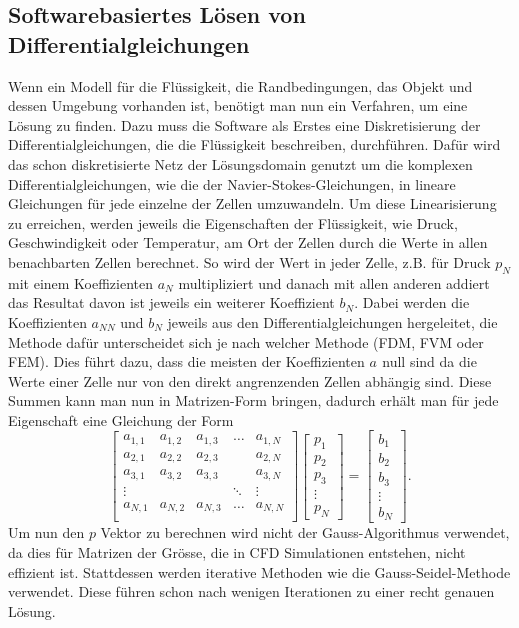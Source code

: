 \subsection{Softwarebasiertes Lösen von Differentialgleichungen}
Wenn ein Modell für die Flüssigkeit, die Randbedingungen, das Objekt und dessen Umgebung vorhanden ist, benötigt man nun ein Verfahren, um eine Lösung zu finden. 
Dazu muss die Software als Erstes eine Diskretisierung der Differentialgleichungen, die die Flüssigkeit beschreiben, durchführen.
Dafür wird das schon diskretisierte Netz der Lösungsdomain genutzt um die komplexen Differentialgleichungen, wie die der Navier-Stokes-Gleichungen, in lineare Gleichungen für jede einzelne der Zellen umzuwandeln.
Um diese Linearisierung zu erreichen, werden jeweils die Eigenschaften der Flüssigkeit, wie Druck, Geschwindigkeit oder Temperatur, am Ort der Zellen durch die Werte in allen benachbarten Zellen berechnet.
So wird der Wert in jeder Zelle, z.B. für Druck $p_N$ mit einem Koeffizienten $ a_{N} $ multipliziert und danach mit allen anderen addiert das Resultat davon ist jeweils ein weiterer Koeffizient $b_N$.
Dabei werden die Koeffizienten $a_{NN}$ und $b_{N }$ jeweils aus den Differentialgleichungen hergeleitet, die Methode dafür unterscheidet sich je nach welcher Methode (FDM, FVM oder FEM).
Dies führt dazu, dass die meisten der Koeffizienten $a_{}$ null sind da die Werte einer Zelle nur von den direkt angrenzenden Zellen abhängig sind.
Diese Summen kann man nun in Matrizen-Form bringen, dadurch erhält man für jede Eigenschaft eine Gleichung der Form
\begin{equation}
\begin{bmatrix}
	a_{1,1} &  a_{1,2} & a_{1,3} & \dots & a_{1,N} \\
	a_{2,1} &  a_{2,2} & a_{2,3} &  & a_{2,N} \\
	a_{3,1} &  a_{3,2} & a_{3,3} &  & a_{3,N} \\
	\vdots & &  & \ddots & \vdots \\
	a_{N,1} &  a_{N,2} & a_{N,3} & \dots & a_{N,N} \\
\end{bmatrix}
\begin{bmatrix}
	p_{1} \\
	p_{2} \\
	p_{3} \\
	\vdots \\
	p_{N}
\end{bmatrix}
= 
\begin{bmatrix}
b_{1} \\
b_{2} \\
b_{3} \\
\vdots \\
b_{N}
\end{bmatrix}
.
\end{equation}
Um nun den $p$ Vektor zu berechnen wird nicht der Gauss-Algorithmus verwendet, da dies für Matrizen der Grösse, die in CFD Simulationen entstehen, nicht effizient ist.
Stattdessen werden iterative Methoden wie die Gauss-Seidel-Methode verwendet.
Diese führen schon nach wenigen Iterationen zu einer recht genauen Lösung.